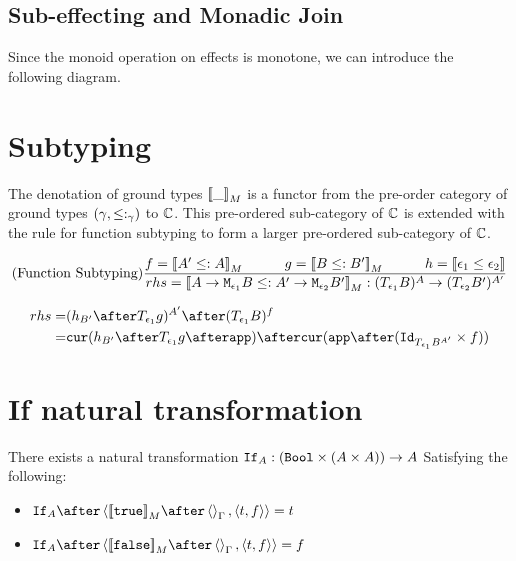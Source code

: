 {\subsection{Sub-effecting and Monadic Join}\label{SubEffectJoin}
Since the monoid operation on effects is monotone, we can introduce the following diagram.


\section{Subtyping}

The denotation of ground types ${\bf [\![}\_{\bf ]\!]}_M$ is a functor from the pre-order category of ground types $(\gamma, \leq:_{\gamma})$
to $\mathbb{C}$. This pre-ordered sub-category of $\mathbb{C}$ is extended with the rule for function subtyping to form a larger pre-ordered sub-category of $\mathbb{C}$.

$$
\treerule{Function Subtyping}{f = \deno{A' \subtype A} \s\s g = \deno{B \subtype B'} \s\s h=\dse{\e_1}{\e_2}}{rhs = \deno{\lamtype{A}{\e_1}{B} \subtype \lamtype{A'}{\e_2}{B'}}: (\T{\e_1}{B})^A \rightarrow (\T{\e_2}{B'})^{A'}}
$$

\begin{equation}
    \begin{split}
        rhs = & (h_{B'} \after \T{\e_1}{g})^{A'}
        \after (\T{\e_1}{B})^f \\
        = & \cur{h_{B'}  \after \T{\e_1}{g}\after \app} \after \cur{\app \after (\Id{\T{\e_1}{B}^{A'}} \times f)}\\
    \end{split}
\end{equation}



\section{If natural transformation}
There exists a natural transformation $\texttt{If}_{A}: (\texttt{Bool} \times (A \times A)) \rightarrow A$
Satisfying the following:
\begin{itemize}
    \item $\ifnt{A}  \after \pr{\deno{\t}\after \term{\G}}{\pr{t}{f}} = t$
    \item $\ifnt{A} \after \pr{\deno{\f}\after \term{\G}}{\pr{t}{f}} = f$
\end{itemize}
}

\ifdefined\NoDocument
\else
\documentclass{report}


    \CategoryRequirements{}

\fi
